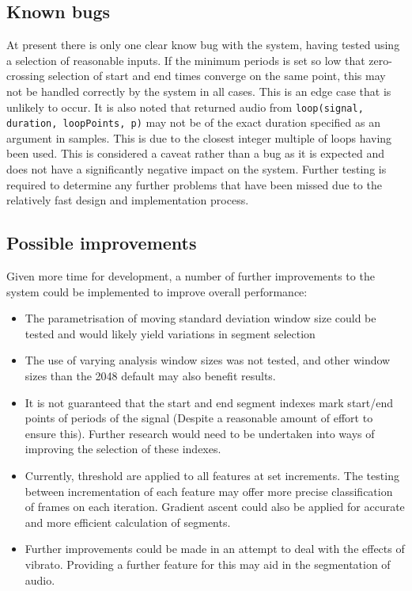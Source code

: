 \documentclass[titlepage]{scrartcl}
\begin{document}
\subsection{Known bugs}
At present there is only one clear know bug with the system, having tested using a
selection of reasonable inputs. If the minimum periods is set so low that
zero-crossing selection of start and end times converge on the same point, this
may not be handled correctly by the system in all cases. This is an edge case
that is unlikely to occur.
It is also noted that returned audio from \texttt{loop(signal, duration,
loopPoints, p)} may not be of the exact duration specified as an argument in
samples. This is due to the closest integer multiple of loops having been used.
This is considered a caveat rather than a bug as it is expected and does not
have a significantly negative impact on the system.
Further testing is required to determine any further problems that have been
missed due to the relatively fast design and implementation process. 

\subsection{Possible improvements}
Given more time for development, a number of further improvements to the system
could be implemented to improve overall performance:
\begin{itemize}
    \item The parametrisation of moving standard deviation window size could
        be tested and would likely yield variations in segment selection
    \item The use of varying analysis window sizes was not tested, and other
        window sizes than the 2048 default may also benefit results.
    \item It is not guaranteed that the start and end segment indexes mark
        start/end points of periods of the signal (Despite a reasonable amount
        of effort to ensure this). Further research would need to be undertaken
        into ways of improving the selection of these indexes.
    \item Currently, threshold are applied to all features at set increments.
        The testing between incrementation of each feature may offer more
        precise classification of frames on each iteration. Gradient ascent
        could also be applied for accurate and more efficient calculation of
        segments.
    \item Further improvements could be made in an attempt to deal with the
        effects of vibrato. Providing a further feature for this may aid in the
        segmentation of audio.
\end{itemize}
\end{document}
